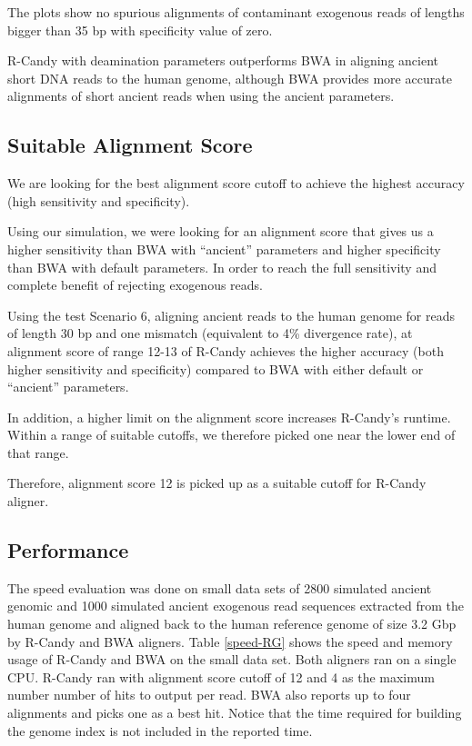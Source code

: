 \documentclass[11pt,a4paper]{report}
\newcommand{\quotes}[1]{``#1''}
\begin{document}
The plots show no spurious alignments of contaminant exogenous reads of lengths 
bigger than 35 bp with specificity value of zero.

R-Candy with deamination parameters outperforms BWA in aligning ancient short DNA
reads to the human genome, although BWA provides more accurate alignments of short 
ancient reads when using the ancient parameters. 
 



\subsection{Suitable Alignment Score} 
\label{Suitable Alignment Score}

We are looking for the best alignment score cutoff to achieve the 
highest accuracy (high sensitivity and specificity).

Using our simulation, we were looking for an alignment score that 
gives us a higher sensitivity than BWA with \quotes{ancient} parameters 
and higher specificity than BWA with default parameters.
In order to reach the full sensitivity and complete benefit of rejecting
exogenous reads. 

Using the test Scenario 6, aligning ancient reads to the human
genome for reads of length 30 bp and one mismatch (equivalent to 4\% 
divergence rate), at alignment score of range 12-13 of R-Candy 
achieves the higher accuracy (both higher sensitivity and 
specificity) compared to BWA with either default or \quotes{ancient} 
parameters.

In addition, a higher limit on the alignment score increases R-Candy's runtime.
Within a range of suitable cutoffs, we therefore picked one near the lower end
of that range.

Therefore, alignment score 12 is picked up as a suitable cutoff for R-Candy 
aligner. 


\subsection{Performance} \label{Performance}

The speed evaluation was done on small data sets of 2800 simulated ancient 
genomic and 1000 simulated ancient exogenous read sequences extracted from
the human genome and aligned back to the human reference genome of size 3.2 
Gbp by R-Candy and BWA aligners.
Table \ref{speed-RG} shows the speed and memory usage of R-Candy and BWA on 
the small data set. Both aligners ran on a single CPU. 
R-Candy ran with alignment score cutoff of 12 and 4 as the maximum
number number of hits to output per read. BWA also reports up to four
alignments and picks one as a best hit.  Notice that the time required for
building the genome index is not included in the reported time.\\
\end{document}
